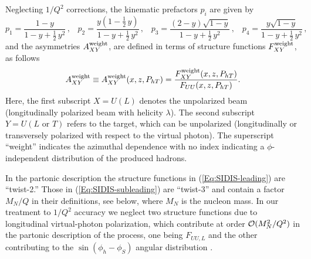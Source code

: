 \documentclass[a4paper,11pt]{article}
\newcommand{\be}{\begin{equation}}
\newcommand{\ee}{\end{equation}}
\newcommand{\ba}{\begin{eqnarray}}
\newcommand{\ea}{\end{eqnarray}}
\newcommand{\slim}{\mskip 1.5mu}       %
\newcommand{\bp}[1]{{\color[rgb]{0,0.65,0.35}#1}}
\def\Phperp{P_{hT}}
\begin{document}
Neglecting $1/Q^2$ corrections, the kinematic prefactors $p_i$ are given by
\be\label{Eq:y-prefactors}
	p_1 = \frac{1-y}{1-y+\frac12\,y^2} 		\, , \;\;\;
	p_2 = \frac{y(1-\frac12\,y)}{1-y+\frac12\,y^2}	\, , \;\;\;
	p_3 = \frac{(2-y)\sqrt{1-y}}{1-y+\frac12\,y^2} 	\, , \;\;\;
	p_4 = \frac{y\sqrt{1-y}}{1-y+\frac12\,y^2}     	\, ,
\ee
and the asymmetries {$A_{XY}^{\rm weight}$,  are defined in terms of
structure functions $F_{XY}^{\rm weight}$, as follows}
\be
	A_{XY}^{\rm weight}\equiv A_{XY}^{\rm weight}(x,z,\Phperp)=
	\frac{F_{XY}^{\rm weight}(x,z,\Phperp)}{F_{UU}(x,z,\Phperp)}.
\ee
Here, the first subscript $X=U(L)$ denotes the unpolarized beam
(longitudinally polarized beam with helicity $\lambda$). The second
subscript $Y=U(L\text{ or }T)$ refers to the target, which can be unpolarized
(longitudinally or transversely polarized with respect to the virtual photon).
The superscript ``weight'' indicates the azimuthal dependence with no index
indicating \bp{a $\phi$-independent} distribution of the produced hadrons.

In the partonic description the structure functions in
(\ref{Eq:SIDIS-leading})    are ``twist-2.'' Those in
(\ref{Eq:SIDIS-subleading}) are ``twist-3'' and contain a
factor $M_N/Q$ in their definitions, see below,
where $M_N$ is the nucleon mass. In our treatment to $1/Q^2$
accuracy we neglect two structure functions due to longitudinal virtual-photon
polarization, which contribute at order ${\cal O}(M_N^2/Q^2)$ in the
partonic description of the process, one being $F_{UU,L}$ and the other
contributing to the $\sin(\phi_h-\phi_S)$ angular distribution
\cite{Bacchetta:2006tn}.
\end{document}
